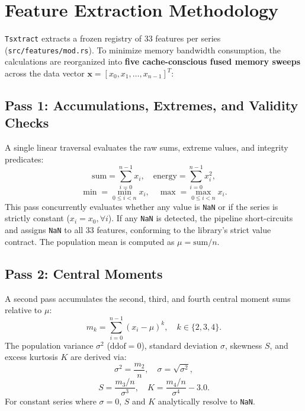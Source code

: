 \documentclass[conference]{IEEEtran}
\newcommand{\tsxtract}{\texttt{Tsxtract}}
\begin{document}
\section{Feature Extraction Methodology}
\label{sec:feature_set}
\tsxtract{} extracts a frozen registry of 33 features per series (\texttt{src/features/mod.rs}). To minimize memory bandwidth consumption, the calculations are reorganized into \textbf{five cache-conscious fused memory sweeps} across the data vector $\bm{x} = [x_0, x_1, \dots, x_{n-1}]^T$:

\subsection{Pass 1: Accumulations, Extremes, and Validity Checks}
A single linear traversal evaluates the raw sums, extreme values, and integrity predicates:
\begin{equation}
\label{eq:pass1_sums}
\text{sum} = \sum_{i=0}^{n-1} x_i, \quad \text{energy} = \sum_{i=0}^{n-1} x_i^2,
\end{equation}
\begin{equation}
\label{eq:pass1_extremes}
\min = \min_{0 \le i < n} x_i, \quad \max = \max_{0 \le i < n} x_i.
\end{equation}
This pass concurrently evaluates whether any value is \texttt{NaN} or if the series is strictly constant ($x_i = x_0, \forall i$). If any \texttt{NaN} is detected, the pipeline short-circuits and assigns \texttt{NaN} to all 33 features, conforming to the library's strict value contract. The population mean is computed as $\mu = \text{sum} / n$.

\subsection{Pass 2: Central Moments}
A second pass accumulates the second, third, and fourth central moment sums relative to $\mu$:
\begin{equation}
\label{eq:pass2_central_moments}
m_k = \sum_{i=0}^{n-1} (x_i - \mu)^k, \quad k \in \{2, 3, 4\}.
\end{equation}
The population variance $\sigma^2$ ($\text{ddof}=0$), standard deviation $\sigma$, skewness $S$, and excess kurtosis $K$ are derived via:
\begin{equation}
\label{eq:pass2_var_std}
\sigma^2 = \frac{m_2}{n}, \quad \sigma = \sqrt{\sigma^2},
\end{equation}
\begin{equation}
\label{eq:pass2_skew_kurt}
S = \frac{m_3 / n}{\sigma^3}, \quad K = \frac{m_4 / n}{\sigma^4} - 3.0.
\end{equation}
For constant series where $\sigma = 0$, $S$ and $K$ analytically resolve to \texttt{NaN}.
\end{document}
